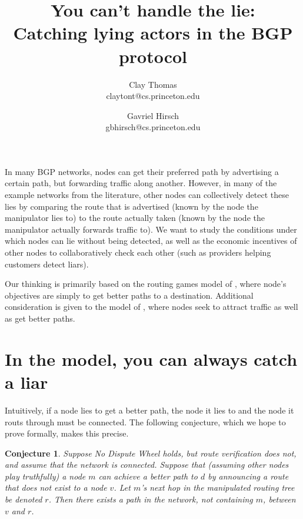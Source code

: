 \documentclass[12pt]{article}
\newtheorem{conjecture}{Conjecture}
\begin{document}
 
\title{
  You can't handle the lie: \\
  Catching lying actors in the BGP protocol 
}
\author{
  Clay Thomas\\ claytont@cs.princeton.edu
  \and 
  Gavriel Hirsch\\ gbhirsch@cs.princeton.edu 
}
\maketitle

In many BGP networks, nodes can get their preferred path
by advertising a certain path, but forwarding traffic along another.
However, in many of the example networks from the literature,
other nodes can collectively detect these lies
by comparing the route that is advertised (known by the node
the manipulator lies to)
to the route actually taken
(known by the node the manipulator actually forwards traffic to).
We want to study the conditions under which nodes
can lie without being detected,
as well as the economic incentives of other nodes to collaboratively
check each other (such as providers helping customers detect liars).

Our thinking is primarily based on the routing games model of
\cite{RoutingGames}, where node's objectives are simply to get
better paths to a destination.
Additional consideration is given to the model
of \cite{Attraction}, where nodes seek to attract traffic as
well as get better paths.

\section{In the \cite{RoutingGames} model, you can always catch a liar}

  Intuitively, if a node lies to get a better path, the node it lies
  to and the node it routs through must be connected.
  The following conjecture, which we hope to prove formally,
  makes this precise.
  \begin{conjecture}
    Suppose No Dispute Wheel holds, but route verification does not, and
    assume that the network is connected.
    Suppose that (assuming other nodes play truthfully)
    a node $m$ can achieve a better path to $d$ by announcing
    a route that does not exist to a node $v$.
    Let $m$'s next hop in the manipulated routing tree be denoted $r$.
    Then there exists a path in the network, not containing $m$,
    between $v$ and $r$.
  \end{conjecture}
\end{document}

